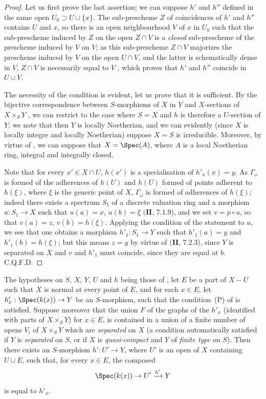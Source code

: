 \begin{proof}
Let us first prove the last assertion;
we can suppose $h'$ and $h''$ defined in the same open $U_0\supset U\cup\{x\}$.
The sub-prescheme $Z$ of coincidences of $h'$ and $h''$  contains $U$ and $x$, so there is an open neighbourhood $V$ of $x$ in $U_0$ such that the sub-prescheme induced by $Z$ on the open $Z\cap V$ is a \emph{closed} sub-prescheme of the prescheme induced by $V$ on $V$;
as this sub-prescheme $Z\cap V$ majorizes the prescheme induced by $V$ on the open $U\cap V$, and the latter is schematically dense in $V$, $Z\cap V$ is necessarily equal to $V$ , which proves that $h'$ and $h''$ coincide in $U\cup V$.

The necessity of the condition is evident, let us prove that it is sufficient.
By the bijective correspondence between $S$-morphisms of $X$ in $Y$ and $X$-sections of $X\times_S Y$ , we can restrict to the case where $S=X$ and $h$ is therefore a $U$-section of $Y$;
we note that then $Y$ is locally Noetherian, and we can evidently (since $X$ is locally integre and locally Noetherian) suppose $X=S$ is irreducible.
Moreover, by virtue of , we can suppose that $X=\Spec(A)$, where $A$ is a local Noetherian ring, integral and integrally closed.

Note that for every $x'\in X\cap U$, $h(x')$ is a specialisation of $h'_x(x)=y$.
As $\Gamma_\omega$ is formed of the adherences of $h(U)$ and $h(U)$ formed of points adherent to $h(\xi)$, where $\xi$ is the generic point of $X$, $\Gamma_\omega$ is formed of adherences of $h(\xi)$;
indeed there exists a spectrum $S_1$ of a discrete valuation ring and a morphism $u:S_1\to X$ such that $u(a)=x$, $u(b)=\xi$ $(\mathbf{II}$, 7.1.9), and we set $v=p\circ u$, so that $v(a)=z$, $v(b)=h(\xi)$.
Applying the condition of the statement to $u$, we see that one obtains a morphism $h'_1:S_1\to Y$ such that $h'_1(a)=y$ and $h'_1(b)=h(\xi)$;
but this means $z=y$ by virtue of $(\mathbf{II}$, 7.2.3), since $Y$ is separated on $X$ and $v$ and $h'_1$ must coincide, since they are equal at $b$.
C.Q.F.D.
\end{proof}

\begin{corollary}[20.4.7]
\label{IV.20.4.7}
The hypotheses on $S$, $X$, $Y$, $U$ and $h$ being those of , let $E$ be a part of $X-U$ such that $X$ is normal at every point of $E$, and for each $x\in E$, let $h'_x:\Spec(k(x))\to Y$ be an $S$-morphism, such that the condition~(P) of  is satisfied.
Suppose moreover that the union $F$ of the graphs of the $h'_x$ (identified with parts of $X\times_S Y$) for $x\in E$, is contained in a union of a finite number of opens $V_i$ of $X\times_S Y$ which are \emph{separated} on $X$ (a condition automatically satisfied if $Y$ is \emph{separated} on $S$, or if $X$ is \emph{quasi-compact} and $Y$ of \emph{finite type} on $S$).
Then there exists an $S$-morphism $h':U'\to Y$, where $U'$ is an open of $X$ containing $U\cup E$, such that, for every $x\in E$, the composed
\[
  \Spec(k(x))\to U'\xrightarrow{h'}Y
\]
is equal to $h'_x$.
\end{corollary}

